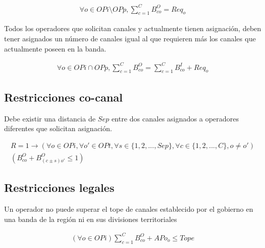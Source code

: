 \begin{equation}
	\begin{array}{cc}
		\forall o \in OPi \setminus OPp, \sum \limits^{C}_{c=1} B^{O}_{co} = Req_{o}
	\end{array}
\end{equation}

Todos los operadores que solicitan canales y actualmente tienen asignación, deben tener asignados un número de canales igual al que requieren más los canales que actualmente poseen en la banda.

\begin{equation}
	\begin{array}{cc}
		\forall o \in OPi \cap OPp, \sum \limits^{C}_{c=1}B^{O}_{co} = \sum \limits^{C}_{c=1}B^{I}_{co} + Req_{o}
	\end{array}
\end{equation}

\subsection{Restricciones co-canal}

Debe existir una distancia de $Sep$ entre dos canales asignados a operadores diferentes que solicitan asignación.

\begin{equation}
	\begin{array}{cc}
	R=1 \to (\forall o \in OPi, \forall o' \in OPt, \forall s \in \{1,2,...,Sep\}, \forall c \in \{1,2,...,C\} , o \neq o')\\(B^{O}_{co}+B^{O}_{(c \pm s)o'} \leq 1)
	\end{array}
\end{equation}

\subsection{Restricciones legales}

Un operador no puede superar el tope de canales establecido por el gobierno en una banda de la región ni en sus divisiones territoriales

\begin{equation}
	\begin{array}{cc}
	(\forall o \in OPi)\sum \limits^{C}_{c=1} B^{O}_{co} + APo_{o} \leq Tope
	\end{array}
\end{equation}


